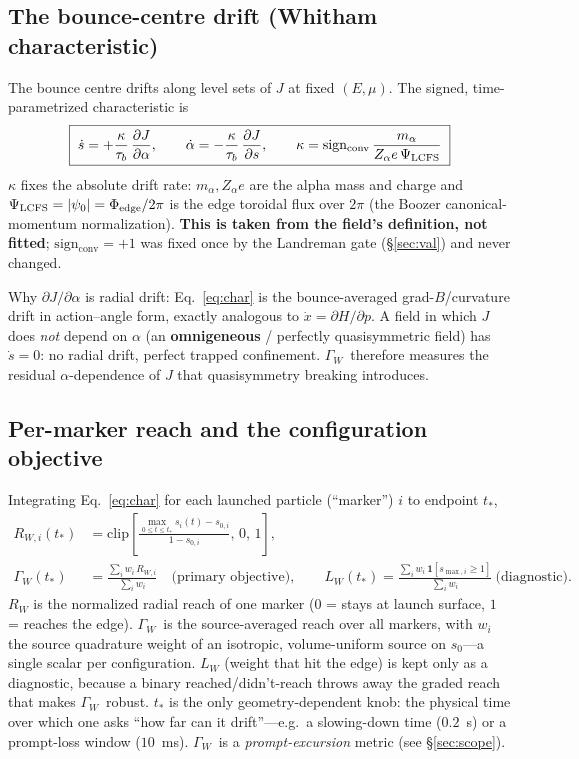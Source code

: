 \documentclass[11pt]{article}
\newcommand{\GW}{\ensuremath{\Gamma_W}}
\begin{document}
\subsection{The bounce-centre drift (Whitham characteristic)}
The bounce centre drifts along level sets of $J$ at fixed $(E,\mu)$. The signed,
time-parametrized characteristic is
\begin{equation}
  \boxed{\;\dot s = +\frac{\kappa}{\tau_b}\,\frac{\partial J}{\partial\alpha},\qquad
          \dot\alpha = -\frac{\kappa}{\tau_b}\,\frac{\partial J}{\partial s},\qquad
          \kappa = \mathrm{sign_{conv}}\,\frac{m_\alpha}{Z_\alpha e\,\Psi_{\rm LCFS}}\;}
  \label{eq:char}
\end{equation}
$\kappa$ fixes the absolute drift rate: $m_\alpha, Z_\alpha e$ are the alpha mass and charge and
$\Psi_{\rm LCFS}=|\psi_0|=\Phi_{\rm edge}/2\pi$ is the edge toroidal flux over $2\pi$ (the Boozer
canonical-momentum normalization). \textbf{This is taken from the field's definition, not
fitted}; $\mathrm{sign_{conv}}=+1$ was fixed once by the Landreman gate (\S\ref{sec:val}) and
never changed.

Why $\partial J/\partial\alpha$ is radial drift: Eq.~\eqref{eq:char} is the bounce-averaged
grad-$B$/curvature drift in action--angle form, exactly analogous to $\dot x=\partial H/\partial
p$. A field in which $J$ does \emph{not} depend on $\alpha$ (an \textbf{omnigeneous} / perfectly
quasisymmetric field) has $\dot s=0$: no radial drift, perfect trapped confinement. \GW\
therefore measures the residual $\alpha$-dependence of $J$ that quasisymmetry breaking
introduces.

\subsection{Per-marker reach and the configuration objective}
Integrating Eq.~\eqref{eq:char} for each launched particle (``marker'') $i$ to endpoint $t_\ast$,
\begin{align}
  R_{W,i}(t_\ast) &= \mathrm{clip}\!\left[\frac{\max_{0\le t\le t_\ast}s_i(t)-s_{0,i}}{1-s_{0,i}},\,0,\,1\right],
      \label{eq:RW}\\[0.3em]
  \GW(t_\ast)     &= \frac{\sum_i w_i\,R_{W,i}}{\sum_i w_i}\quad\text{(primary objective)},\qquad
  L_W(t_\ast) = \frac{\sum_i w_i\,\mathbf{1}[s_{\max,i}\ge 1]}{\sum_i w_i}\ \text{(diagnostic)}.
      \label{eq:GW}
\end{align}
$R_W$ is the normalized radial reach of one marker ($0$ = stays at launch surface, $1$ = reaches
the edge). \GW\ is the source-averaged reach over all markers, with $w_i$ the source quadrature
weight of an isotropic, volume-uniform source on $s_0$---a single scalar per configuration.
$L_W$ (weight that hit the edge) is kept only as a diagnostic, because a binary
reached/didn't-reach throws away the graded reach that makes \GW\ robust. $t_\ast$ is the only
geometry-dependent knob: the physical time over which one asks ``how far can it drift''---e.g.\ a
slowing-down time ($0.2$~s) or a prompt-loss window ($10$~ms). \GW\ is a \emph{prompt-excursion}
metric (see \S\ref{sec:scope}).
\end{document}
